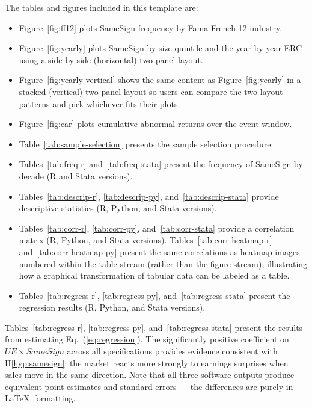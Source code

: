 \documentclass[english,12pt]{article}
\begin{document}
The tables and figures included in this template are:
\begin{itemize}
    \item Figure~\ref{fig:ff12} plots SameSign frequency by Fama-French 12 industry.
    \item Figure~\ref{fig:yearly} plots SameSign by size quintile and the year-by-year ERC using a side-by-side (horizontal) two-panel layout. 
    \item Figure~\ref{fig:yearly-vertical} shows the same content as Figure~\ref{fig:yearly} in a stacked (vertical) two-panel layout so users can compare the two layout patterns and pick whichever fits their plots.
    \item Figure~\ref{fig:car} plots cumulative abnormal returns over the event window.
    \item Table~\ref{tab:sample-selection} presents the sample selection procedure.
    \item Tables~\ref{tab:freq-r} and~\ref{tab:freq-stata} present the frequency of SameSign by decade (R and Stata versions).
    \item Tables~\ref{tab:descrip-r}, \ref{tab:descrip-py}, and~\ref{tab:descrip-stata} provide descriptive statistics (R, Python, and Stata versions).
    \item Tables~\ref{tab:corr-r}, \ref{tab:corr-py}, and~\ref{tab:corr-stata} provide a correlation matrix (R, Python, and Stata versions). Tables~\ref{tab:corr-heatmap-r} and~\ref{tab:corr-heatmap-py} present the same correlations as heatmap images numbered within the table stream (rather than the figure stream), illustrating how a graphical transformation of tabular data can be labeled as a table.
    \item Tables~\ref{tab:regress-r}, \ref{tab:regress-py}, and~\ref{tab:regress-stata} present the regression results (R, Python, and Stata versions).
\end{itemize}

Tables~\ref{tab:regress-r}, \ref{tab:regress-py}, and~\ref{tab:regress-stata} present the results from estimating Eq.~(\ref{eq:regression}). The significantly positive coefficient on $UE \times SameSign$ across all specifications provides evidence consistent with H\ref{hyp:samesign}: the market reacts more strongly to earnings surprises when sales move in the same direction. Note that all three software outputs produce equivalent point estimates and standard errors --- the differences are purely in \LaTeX\ formatting.
\end{document}

